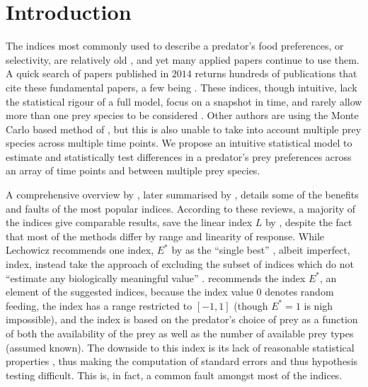 \documentclass[smallextended]{svjour3}
\begin{document}

\section{Introduction}
\label{intro}

The indices most commonly used to describe a predator's food preferences, or selectivity, are relatively old \citep{Ivlev:1964,Jacobs:1974,Chesson:1978,Strauss:1979,Vanderploeg:1979,Chesson:1983}, and yet many applied papers continue to use them.  A quick search of papers published in $2014$ returns hundreds of publications that cite these fundamental papers, a few being \citet{Clements:2014,Hansen:2014,Hellstrom:2014,Lyngdoh:2014,Madduppa:2014}.  These indices, though intuitive, lack the statistical rigour of a full model, focus on a snapshot in time, and rarely allow more than one prey species to be considered \citep{Lechowicz:1982}.  Other authors are using the Monte Carlo based method of \citet{Agusti:2003} \citep[see][]{Davey:2013,King:2010}, but this is also unable to take into account multiple prey species across multiple time points.  We propose an intuitive statistical model to estimate and statistically test differences in a predator's prey preferences across an array of time points and between multiple prey species.   

A comprehensive overview by \citet{Lechowicz:1982}, later summarised by \citet{Manly:2002}, details some of the benefits and faults of the most popular indices.  According to these reviews, a majority of the indices give comparable results, save the linear index $L$ by \citet{Strauss:1979}, despite the fact that most of the methods differ by range and linearity of response.  While Lechowicz recommends one index, $E^*$ by \citet{Vanderploeg:1979} as the ``single best'' \citep{Lechowicz:1982}, albeit imperfect, index, \citet{Manly:2002} instead take the approach of excluding the subset of indices which do not ``estimate any biologically meaningful value'' \citep{Manly:2002}.  \citet{Lechowicz:1982} recommends the index $E^*$, an element of the \citet{Manly:2002} suggested indices, because the index value $0$ denotes random feeding, the index has a range restricted to $[-1,1]$ (though $E^*=1$ is nigh impossible), and the index is based on the predator's choice of prey as a function of both the availability of the prey as well as the number of available prey types (assumed known).  The downside to this index is its lack of reasonable statistical properties \citep{Lechowicz:1982}, thus making the computation of standard errors and thus hypothesis testing difficult.  This is, in fact, a common fault amongst most of the indices.  
\end{document}
